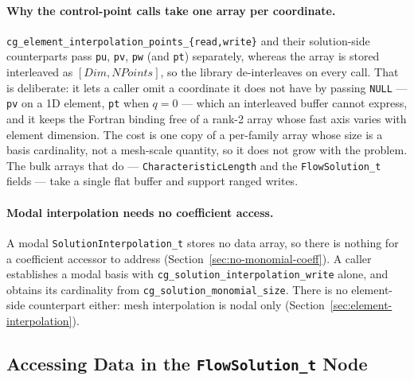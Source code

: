 \documentclass[11pt,letterpaper]{article}
\newif\ifvfourdraft
\newcommand{\vfourmark}{\ifvfourdraft\textcolor{v4violet}{\textbf{[v4]}}\ \fi}
\begin{document}
\paragraph{\vfourmark Why the control-point calls take one array per coordinate.}
\texttt{cg\_element\_interpolation\_points\_\{read,write\}} and their solution-side
counterparts pass \texttt{pu}, \texttt{pv}, \texttt{pw} (and \texttt{pt})
separately, whereas the array is stored interleaved as
$[\textit{Dim}, \textit{NPoints}]$, so the library de-interleaves on every call.
That is deliberate: it lets a caller omit a coordinate it does not have by
passing \texttt{NULL} --- \texttt{pv} on a 1D element, \texttt{pt} when $q=0$ ---
which an interleaved buffer cannot express, and it keeps the Fortran binding free
of a rank-2 array whose fast axis varies with element dimension.  The cost is one
copy of a per-family array whose size is a basis cardinality, not a mesh-scale
quantity, so it does not grow with the problem.  The bulk arrays that do ---
\texttt{CharacteristicLength} and the \texttt{FlowSolution\_t} fields --- take a
single flat buffer and support ranged writes.

\paragraph{\vfourmark Modal interpolation needs no coefficient access.}
A modal \texttt{SolutionInterpolation\_t} stores no data array, so there is nothing
for a coefficient accessor to address (Section~\ref{sec:no-monomial-coeff}).  A
caller establishes a modal basis with \texttt{cg\_solution\_interpolation\_write}
alone, and obtains its cardinality from \texttt{cg\_solution\_monomial\_size}.
There is no element-side counterpart either: mesh interpolation is nodal only
(Section~\ref{sec:element-interpolation}).

\subsection{Accessing Data in the \texttt{FlowSolution\_t} Node}
\label{sec:sol-api}
\end{document}
